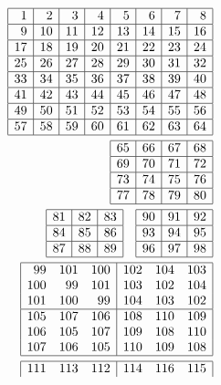 \documentclass[12pt,a4paper]{amsart}
\begin{document}
\begin{align*}
\begin{array}{|r|r|r|r|r|r|r|r|}%
\hline
1&2&3&4&5&6&7&8\\%
\hline
9&10&11&12&13&14&15&16\\%
\hline
17&18&19&20&21&22&23&24\\%
\hline
25&26&27&28&29&30&31&32\\%
\hline
33&34&35&36&37&38&39&40\\%
\hline
41&42&43&44&45&46&47&48\\%
\hline
49&50&51&52&53&54&55&56\\%
\hline
57&58&59&60&61&62&63&64\\%
\hline
\end{array} \\
\begin{array}{|r|r|r|r|}%
\hline
65&66&67&68\\%
\hline
69&70&71&72\\%
\hline
73&74&75&76\\%
\hline
77&78&79&80\\%
\hline
\end{array} \\
\begin{array}{|r|r|r|}%
\hline
81&82&83\\%
\hline
84&85&86\\%
\hline
87&88&89\\%
\hline
\end{array} \quad
\begin{array}{|r|r|r|}%
\hline
90&91&92\\%
\hline
93&94&95\\%
\hline
96&97&98\\%
\hline
\end{array} \\
\begin{array}{|rrr|rrr|}%
\hline
99&101&100&102&104&103\\%
100&99&101&103&102&104\\%
101&100&99&104&103&102\\%
\hline
105&107&106&108&110&109\\%
106&105&107&109&108&110\\%
107&106&105&110&109&108\\%
\hline
\end{array} \\
\begin{array}{|rrr|rrr|}%
\hline
111&113&112&114&116&115\\%

\end{array}
\end{align*}
\end{document}

